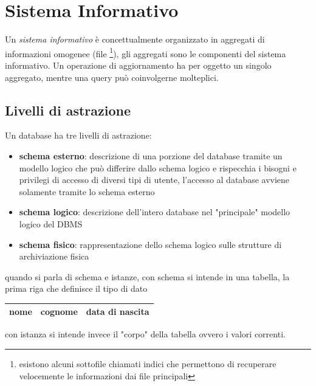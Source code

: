 \documentclass{article}
\begin{document}
\section{Sistema Informativo}
    Un \textit{sistema informativo} è concettualmente organizzato in aggregati di informazioni omogenee (file \footnote{esistono alcuni sottofile chiamati indici che permettono di recuperare velocemente le informazioni dai file principali}), gli aggregati sono le componenti del sistema informativo. Un operazione di aggiornamento ha per oggetto un singolo aggregato, mentre una query può coinvolgerne molteplici.

    \subsection{Livelli di astrazione}
        Un database ha tre livelli di astrazione:
        \begin{itemize}
            \item \textbf{schema esterno}:
            descrizione di una porzione del database tramite un modello logico che può differire dallo schema logico e rispecchia i bisogni e privilegi di accesso di diversi tipi di utente, l'accesso al database avviene solamente tramite lo schema esterno

            \item \textbf{schema logico}:
            descrizione dell'intero database nel "principale" modello logico del DBMS

            \item \textbf{schema fisico}:
            rappresentazione dello schema logico sulle strutture di archiviazione fisica
        \end{itemize}
        quando si parla di schema e istanze, con schema si intende in una tabella, la prima riga che definisce il tipo di dato
            \begin{tabular}{|c|c|c|}
            \hline
                nome &cognome& data di nascita \\
            \hline
            \end{tabular}
        con istanza si intende invece il "corpo" della tabella ovvero i valori correnti.
\end{document}
